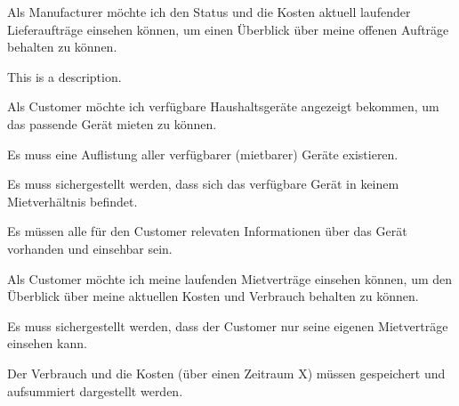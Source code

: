 \begin{tcolorbox}[colback=white,colframe=MidnightBlue!50!black, colbacktitle=MidnightBlue!75!black,title=\textbf{\underline{M10} Lieferaufträge einsehen}]
  \label{req:m10}
  \glqq Als Manufacturer möchte ich den Status und die Kosten aktuell laufender Lieferaufträge einsehen können, um einen Überblick über meine offenen Aufträge behalten zu können. \grqq
  \tcblower
  \begin{tcolorbox}[colback=white,colframe=white!50!black, colbacktitle=white!75!black,title=Task M10.1]
    This is a description.
  \end{tcolorbox}
\end{tcolorbox}


\begin{tcolorbox}[colback=white,colframe=BrickRed!50!black, colbacktitle=BrickRed!75!black,title=\textbf{\underline{C1} Ansicht verfügbarer Geräte}]
  \label{req:c1}
  \glqq Als Customer möchte ich verfügbare Haushaltsgeräte angezeigt bekommen, um das passende Gerät mieten zu können. \grqq
  \tcblower
  \begin{tcolorbox}[colback=white,colframe=white!50!black, colbacktitle=white!75!black,title=Task C1.1]
    Es muss eine Auflistung aller verfügbarer (mietbarer) Geräte existieren.
  \end{tcolorbox}
  \begin{tcolorbox}[colback=white,colframe=white!50!black, colbacktitle=white!75!black,title=Task C1.2]
    Es muss sichergestellt werden, dass sich das verfügbare Gerät in keinem Mietverhältnis befindet.
  \end{tcolorbox}
  \begin{tcolorbox}[colback=white,colframe=white!50!black, colbacktitle=white!75!black,title=Task C1.3]
    Es müssen alle für den Customer relevaten Informationen über das Gerät vorhanden und einsehbar sein.
  \end{tcolorbox}
\end{tcolorbox}

\begin{tcolorbox}[colback=white,colframe=BrickRed!50!black, colbacktitle=BrickRed!75!black,title=\textbf{\underline{C2} Überblick Mietverträge}]
  \label{req:c2}
  \glqq Als Customer möchte ich meine laufenden Mietverträge einsehen können, um den Überblick über meine aktuellen Kosten und Verbrauch behalten zu können. \grqq
  \tcblower
  \begin{tcolorbox}[colback=white,colframe=white!50!black, colbacktitle=white!75!black,title=Task C2.1]
    Es muss sichergestellt werden, dass der Customer nur seine eigenen Mietverträge einsehen kann.
  \end{tcolorbox}
  \begin{tcolorbox}[colback=white,colframe=white!50!black, colbacktitle=white!75!black,title=Task C2.2]
    Der Verbrauch und die Kosten (über einen Zeitraum X) müssen gespeichert und aufsummiert dargestellt werden.
  \end{tcolorbox}
\end{tcolorbox}

